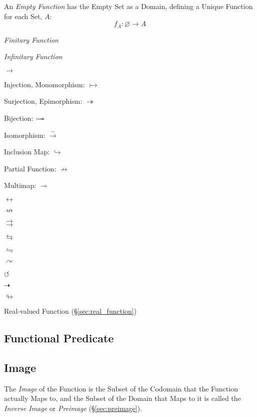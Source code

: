 An \emph{Empty Function} has the Empty Set as a Domain, defining a
Unique Function for each Set, $A$:
\[
  f_A : \varnothing \rightarrow A
\]

\emph{Finitary Function}

\emph{Infinitary Function}

$\rightarrow$

Injection, Monomorphism: $\rightarrowtail$

Surjection, Epimorphism: $\twoheadrightarrow$

Bijection: $\rightarrowtail \hspace{-8pt} \twoheadrightarrow$

Isomorphism: $\xrightarrow{\sim}$

Inclusion Map: $\hookrightarrow$

Partial Function: $\nrightarrow$

Multimap: $\multimap$

$\leftrightarrow$

$\nleftrightarrow$

$\rightrightarrows$

$\leftrightarrows$

$\leftrightharpoons$

$\curvearrowright$

$\circlearrowleft$

$\dashrightarrow$

$\looparrowright$

Real-valued Function (\S\ref{sec:real_function})



\subsection{Functional Predicate}\label{sec:functional_predicate}

\subsection{Image}\label{sec:image}

The \emph{Image} of the Function is the Subset of the Codomain that
the Function actually Maps to, and the Subset of the Domain that Maps
to it is called the \emph{Inverse Image} or \emph{Preimage}
(\S\ref{sec:preimage}).

